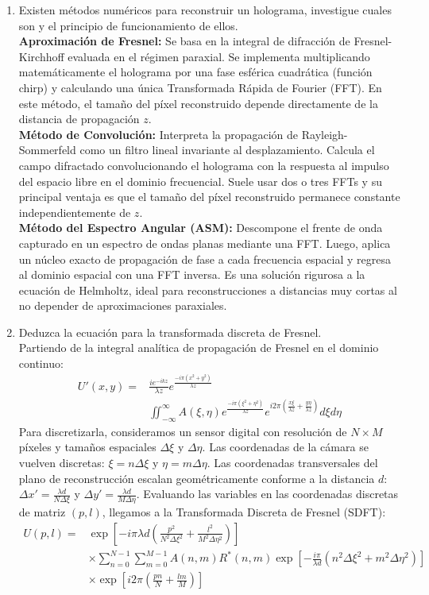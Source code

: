 \documentclass[12pt,a4paper]{article}
\begin{document}
\begin{enumerate}
		\item Existen métodos numéricos para reconstruir un holograma, investigue cuales son y el principio de funcionamiento de ellos.\\
		\textbf{Aproximación de Fresnel:} Se basa en la integral de difracción de Fresnel-Kirchhoff evaluada en el régimen paraxial. Se implementa multiplicando matemáticamente el holograma por una fase esférica cuadrática (función chirp) y calculando una única Transformada Rápida de Fourier (FFT). En este método, el tamaño del píxel reconstruido depende directamente de la distancia de propagación $z$.\\
		\textbf{Método de Convolución:} Interpreta la propagación de Rayleigh-Sommerfeld como un filtro lineal invariante al desplazamiento. Calcula el campo difractado convolucionando el holograma con la respuesta al impulso del espacio libre en el dominio frecuencial. Suele usar dos o tres FFTs y su principal ventaja es que el tamaño del píxel reconstruido permanece constante independientemente de $z$.\\
		\textbf{Método del Espectro Angular (ASM):} Descompone el frente de onda capturado en un espectro de ondas planas mediante una FFT. Luego, aplica un núcleo exacto de propagación de fase a cada frecuencia espacial y regresa al dominio espacial con una FFT inversa. Es una solución rigurosa a la ecuación de Helmholtz, ideal para reconstrucciones a distancias muy cortas al no depender de aproximaciones paraxiales.
		
		\item Deduzca la ecuación para la transformada discreta de Fresnel.\\
		Partiendo de la integral analítica de propagación de Fresnel en el dominio continuo:
		\begin{align*} U'(x,y) =& \frac{i e^{-ikz}}{\lambda z} e^{\frac{-i\pi(x^2 + y^2)}{\lambda z}} \\ &\iint_{-\infty}^{\infty} A(\xi,\eta) e^{\frac{-i\pi(\xi^2 + \eta^2)}{\lambda z}} e^{i 2\pi\left( \frac{x\xi}{\lambda z} + \frac{y\eta}{\lambda z} \right)} d\xi d\eta \end{align*}
		Para discretizarla, consideramos un sensor digital con resolución de $N \times M$ píxeles y tamaños espaciales $\Delta\xi$ y $\Delta\eta$. Las coordenadas de la cámara se vuelven discretas: $\xi = n \Delta\xi$ y $\eta = m \Delta\eta$. Las coordenadas transversales del plano de reconstrucción escalan geométricamente conforme a la distancia $d$: $\Delta x' = \frac{\lambda d}{N \Delta\xi}$ y $\Delta y' = \frac{\lambda d}{M \Delta\eta}$. Evaluando las variables en las coordenadas discretas de matriz $(p, l)$, llegamos a la Transformada Discreta de Fresnel (SDFT):
		\begin{align*} U(p, l) =& \exp\left[ -i\pi \lambda d \left( \frac{p^2}{N^2 \Delta\xi^2} + \frac{l^2}{M^2 \Delta\eta^2} \right) \right] \\ &\times \sum_{n=0}^{N-1} \sum_{m=0}^{M-1} A(n, m) R^*(n, m) \exp\left[ -\frac{i\pi}{\lambda d} (n^2\Delta\xi^2 + m^2\Delta\eta^2) \right] \\ &\times \exp\left[ i 2\pi \left(\frac{p n}{N} + \frac{l m}{M}\right) \right] \end{align*}
		

\end{enumerate}
\end{document}

